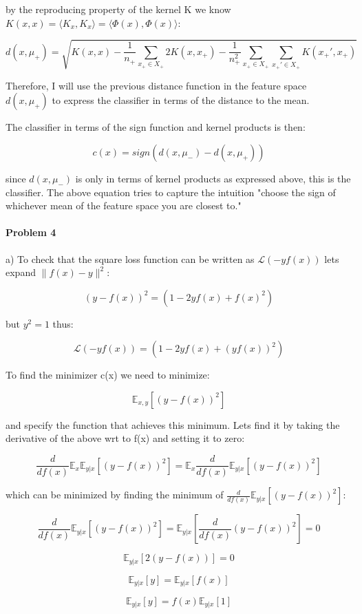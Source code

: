 \documentclass[12pt]{report}
\begin{document}
by the reproducing property of the kernel K we know $K(x,x) = \langle K_x, K_x \rangle =\langle \Phi(x), \Phi(x) \rangle$:
 
$$ d(x, \mu_+) = \sqrt{ K(x,x) - \frac{1}{n_+} \sum_{x_+ \in X_+} 2K(x, x_+) - \frac{1}{n_+^2} \sum_{x_+ \in X_+} \sum_{x_+' \in X_+}  K(x_+', x_+)       }$$

Therefore, I will use the previous distance function in the feature space $ d(x, \mu_+)$ to express the classifier in terms of the distance to the mean.

The classifier in terms of the sign function and kernel products is then:

$$c(x) = sign(d(x, \mu_-) - d(x, \mu_+))$$

since $d(x, \mu_-)$ is only in terms of kernel products as expressed above, this is the classifier. The above equation tries to capture the intuition "choose the sign of whichever mean of the feature space you are closest to."

\paragraph{Problem 4}
a) To check that the square loss function can be written as $\mathcal{L}(-yf(x))$ lets expand $\|f(x) - y\|^2$:

$$(y-f(x))^2 = (1 - 2yf(x) + f(x)^2) $$

but $y^2 = 1$ thus:

$$\mathcal{L}(-yf(x)) = (1 - 2yf(x) + (yf(x))^2)$$

To find the minimizer c(x) we need to minimize: 

$$\mathbb{E}_{x,y}[(y-f(x))^2]$$

and specify the function that achieves this minimum. Lets find it by taking the derivative of the above wrt to f(x) and setting it to zero:

$$\frac{d}{df(x)}\mathbb{E}_{x}\mathbb{E}_{y|x}[(y-f(x))^2] = \mathbb{E}_{x}\frac{d}{df(x)}\mathbb{E}_{y|x}[(y-f(x))^2]$$

which can be minimized by finding the minimum of $\frac{d}{df(x)}\mathbb{E}_{y|x}[(y-f(x))^2]$:

$$ \frac{d}{df(x)}\mathbb{E}_{y|x}[(y-f(x))^2] =  \mathbb{E}_{y|x} \left[ \frac{d}{df(x)}(y-f(x))^2 \right] = 0$$

$$\mathbb{E}_{y|x}[2(y-f(x))] = 0$$

$$\mathbb{E}_{y|x}[y] = \mathbb{E}_{y|x}[f(x)] $$

$$\mathbb{E}_{y|x}[y] = f(x)\mathbb{E}_{y|x}[1] $$
\end{document}
